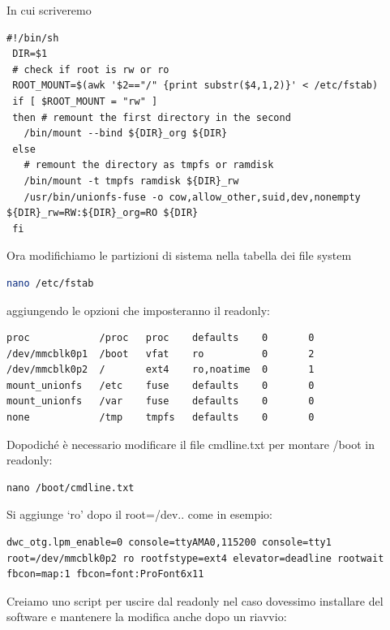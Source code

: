 \noindent In cui scriveremo

\begin{lstlisting}
#!/bin/sh
 DIR=$1
 # check if root is rw or ro
 ROOT_MOUNT=$(awk '$2=="/" {print substr($4,1,2)}' < /etc/fstab)
 if [ $ROOT_MOUNT = "rw" ]
 then # remount the first directory in the second
   /bin/mount --bind ${DIR}_org ${DIR}
 else
   # remount the directory as tmpfs or ramdisk
   /bin/mount -t tmpfs ramdisk ${DIR}_rw
   /usr/bin/unionfs-fuse -o cow,allow_other,suid,dev,nonempty ${DIR}_rw=RW:${DIR}_org=RO ${DIR}
 fi
\end{lstlisting}

\noindent Ora modifichiamo le partizioni di sistema nella tabella dei file system
\begin{lstlisting}[language=bash]
nano /etc/fstab
\end{lstlisting}

\noindent aggiungendo le opzioni che imposteranno il readonly:

\begin{lstlisting}
proc            /proc   proc    defaults    0       0
/dev/mmcblk0p1  /boot   vfat    ro          0       2
/dev/mmcblk0p2  /       ext4    ro,noatime  0       1
mount_unionfs   /etc    fuse    defaults    0       0
mount_unionfs   /var    fuse    defaults    0       0
none            /tmp    tmpfs   defaults    0       0
\end{lstlisting}

\noindent Dopodiché è necessario modificare il file cmdline.txt per montare /boot in readonly:

\begin{lstlisting}
nano /boot/cmdline.txt
\end{lstlisting}

\noindent Si aggiunge ‘ro’ dopo il root=/dev.. come in esempio:
\begin{lstlisting}
dwc_otg.lpm_enable=0 console=ttyAMA0,115200 console=tty1 root=/dev/mmcblk0p2 ro rootfstype=ext4 elevator=deadline rootwait fbcon=map:1 fbcon=font:ProFont6x11
\end{lstlisting}

\noindent Creiamo uno script per uscire dal readonly nel caso dovessimo installare del software e mantenere la modifica anche dopo un riavvio:

